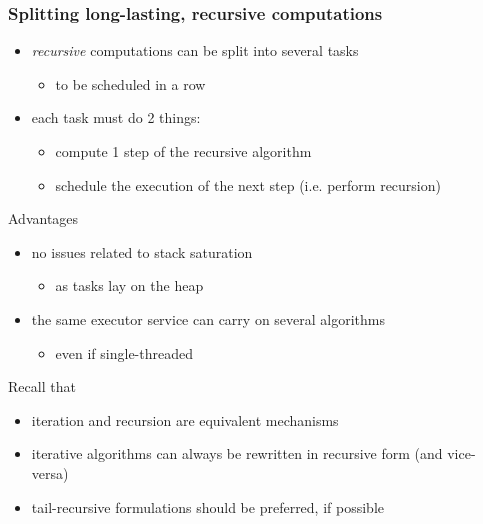 \documentclass[presentation]{beamer}\mode<presentation>{\usetheme{AMSBolognaFC}}
\begin{document}
\begin{frame}[allowframebreaks]
    \frametitle{Splitting long-lasting, \textbf{recursive} computations}

    \begin{itemize}
        \item \emph{recursive} computations can be \alert{split} into several tasks
        \begin{itemize}
            \item to be scheduled in a row
        \end{itemize}

        \bigskip

        \item each task must do 2 things:
        \begin{itemize}
            \item compute 1 step of the recursive algorithm
            \item schedule the execution of the next step (i.e. perform recursion)
        \end{itemize}

    \end{itemize}

    \bigskip

    \begin{block}{Advantages}
        \begin{itemize}
            \item no issues related to stack saturation
            \begin{itemize}
                \item as tasks lay on the heap
            \end{itemize}

            \item the same executor service can carry on several algorithms
            \begin{itemize}
                \item even if single-threaded
            \end{itemize}
        \end{itemize}
    \end{block}

    \bigskip

    \begin{exampleblock}{Recall that}
        \begin{itemize}
            \item iteration and recursion are equivalent mechanisms
            \item iterative algorithms can always be rewritten in recursive form (and vice-versa)
            \item tail-recursive formulations should be preferred, if possible
        \end{itemize}
    \end{exampleblock}


\end{frame}
\end{document}
